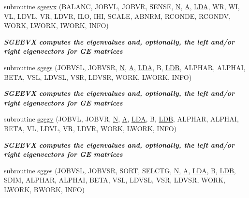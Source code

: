 \begin{DoxyCompactItemize}
subroutine \hyperlink{group__realGEeigen_gadf06d28b4793cbab21e898fcb713d5a5}{sgeevx} (B\+A\+L\+A\+N\+C, J\+O\+B\+V\+L, J\+O\+B\+V\+R, S\+E\+N\+S\+E, \hyperlink{polmisc_8c_a0240ac851181b84ac374872dc5434ee4}{N}, \hyperlink{classA}{A}, \hyperlink{example__user_8c_ae946da542ce0db94dced19b2ecefd1aa}{L\+D\+A}, W\+R, W\+I, V\+L, L\+D\+V\+L, V\+R, L\+D\+V\+R, I\+L\+O, I\+H\+I, S\+C\+A\+L\+E, A\+B\+N\+R\+M, R\+C\+O\+N\+D\+E, R\+C\+O\+N\+D\+V, W\+O\+R\+K, L\+W\+O\+R\+K, I\+W\+O\+R\+K, I\+N\+F\+O)
\begin{DoxyCompactList}\small\item\em {\bfseries  S\+G\+E\+E\+V\+X computes the eigenvalues and, optionally, the left and/or right eigenvectors for G\+E matrices} \end{DoxyCompactList}\item 
subroutine \hyperlink{group__realGEeigen_gad6edd6ac01e4a249743c45803d9b37a2}{sgegs} (J\+O\+B\+V\+S\+L, J\+O\+B\+V\+S\+R, \hyperlink{polmisc_8c_a0240ac851181b84ac374872dc5434ee4}{N}, \hyperlink{classA}{A}, \hyperlink{example__user_8c_ae946da542ce0db94dced19b2ecefd1aa}{L\+D\+A}, B, \hyperlink{example__user_8c_a50e90a7104df172b5a89a06c47fcca04}{L\+D\+B}, A\+L\+P\+H\+A\+R, A\+L\+P\+H\+A\+I, B\+E\+T\+A, V\+S\+L, L\+D\+V\+S\+L, V\+S\+R, L\+D\+V\+S\+R, W\+O\+R\+K, L\+W\+O\+R\+K, I\+N\+F\+O)
\begin{DoxyCompactList}\small\item\em {\bfseries  S\+G\+E\+E\+V\+X computes the eigenvalues and, optionally, the left and/or right eigenvectors for G\+E matrices} \end{DoxyCompactList}\item 
subroutine \hyperlink{group__realGEeigen_ga80fd7fa3159b96cf467a9584f6464310}{sgegv} (J\+O\+B\+V\+L, J\+O\+B\+V\+R, \hyperlink{polmisc_8c_a0240ac851181b84ac374872dc5434ee4}{N}, \hyperlink{classA}{A}, \hyperlink{example__user_8c_ae946da542ce0db94dced19b2ecefd1aa}{L\+D\+A}, B, \hyperlink{example__user_8c_a50e90a7104df172b5a89a06c47fcca04}{L\+D\+B}, A\+L\+P\+H\+A\+R, A\+L\+P\+H\+A\+I, B\+E\+T\+A, V\+L, L\+D\+V\+L, V\+R, L\+D\+V\+R, W\+O\+R\+K, L\+W\+O\+R\+K, I\+N\+F\+O)
\begin{DoxyCompactList}\small\item\em {\bfseries  S\+G\+E\+E\+V\+X computes the eigenvalues and, optionally, the left and/or right eigenvectors for G\+E matrices} \end{DoxyCompactList}\item 
subroutine \hyperlink{group__realGEeigen_ga6a36f16104f3f8ae8e499cc7efaa2195}{sgges} (J\+O\+B\+V\+S\+L, J\+O\+B\+V\+S\+R, S\+O\+R\+T, S\+E\+L\+C\+T\+G, \hyperlink{polmisc_8c_a0240ac851181b84ac374872dc5434ee4}{N}, \hyperlink{classA}{A}, \hyperlink{example__user_8c_ae946da542ce0db94dced19b2ecefd1aa}{L\+D\+A}, B, \hyperlink{example__user_8c_a50e90a7104df172b5a89a06c47fcca04}{L\+D\+B}, S\+D\+I\+M, A\+L\+P\+H\+A\+R, A\+L\+P\+H\+A\+I, B\+E\+T\+A, V\+S\+L, L\+D\+V\+S\+L, V\+S\+R, L\+D\+V\+S\+R, W\+O\+R\+K, L\+W\+O\+R\+K, B\+W\+O\+R\+K, I\+N\+F\+O)

\end{DoxyCompactItemize}
